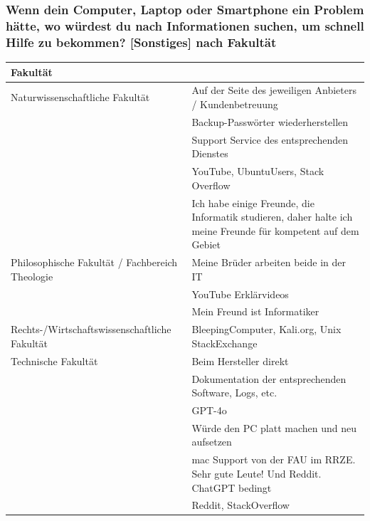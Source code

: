 \documentclass[german,report]{i1thesis}
\begin{document}
\subsubsection*{Wenn dein Computer, Laptop oder Smartphone ein Problem hätte, wo würdest du nach Informationen suchen, um schnell Hilfe zu bekommen? [Sonstiges] nach Fakultät}
\begin{longtable}{|p{5cm}|p{9cm}|}
\hline
Fakultät & \\
\hline
Naturwissenschaftliche Fakultät & Auf der Seite des jeweiligen Anbieters / Kundenbetreuung \\ \cline{2-2}
 & Backup-Passwörter wiederherstellen \\ \cline{2-2}
 & Support Service des entsprechenden Dienstes \\ \cline{2-2}
 & YouTube, UbuntuUsers, Stack Overflow \\ \cline{2-2}
 & Ich habe einige Freunde, die Informatik studieren, daher halte ich meine Freunde für kompetent auf dem Gebiet \\
\hline
Philosophische Fakultät / Fachbereich Theologie & Meine Brüder arbeiten beide in der IT \\ \cline{2-2}
 & YouTube Erklärvideos \\ \cline{2-2}
 & Mein Freund ist Informatiker \\
\hline
Rechts-/Wirtschaftswissenschaftliche Fakultät & BleepingComputer, Kali.org, Unix StackExchange \\
\hline
Technische Fakultät & Beim Hersteller direkt \\ \cline{2-2}
 & Dokumentation der entsprechenden Software, Logs, etc. \\ \cline{2-2}
 & GPT-4o \\ \cline{2-2}
 & Würde den PC platt machen und neu aufsetzen \\ \cline{2-2}
 & mac Support von der FAU im RRZE. Sehr gute Leute! Und Reddit. ChatGPT bedingt \\ \cline{2-2}
 & Reddit, StackOverflow \\
\hline
\end{longtable}
\end{document}
